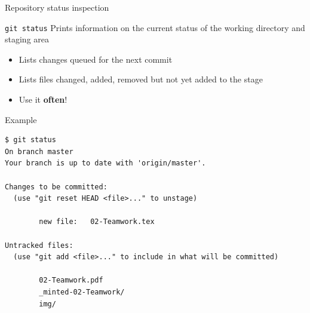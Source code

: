 \documentclass[presentation]{beamer}
\begin{document}
\begin{frame}{Repository status inspection}
    \begin{block}{\texttt{git status}}
        Prints information on the current status of the working directory and staging area
        \begin{itemize}
            \item Lists changes queued for the next commit
            \item Lists files changed, added, removed but not yet added to the stage
            \item Use it \textbf{often}!
        \end{itemize}
    \end{block}
    \begin{block}{Example}
        \begin{verbatim} 
$ git status
On branch master
Your branch is up to date with 'origin/master'.

Changes to be committed:
  (use "git reset HEAD <file>..." to unstage)

        new file:   02-Teamwork.tex

Untracked files:
  (use "git add <file>..." to include in what will be committed)

        02-Teamwork.pdf
        _minted-02-Teamwork/
        img/
        \end{verbatim}
    \end{block}
\end{frame}
\end{document}
